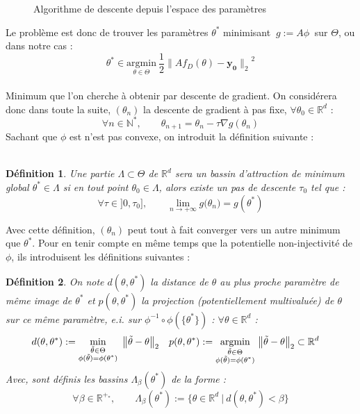 \documentclass[hidelinks, french]{article} %
\newcommand{\N}{\mathbb{N}}
\newcommand{\R}{\mathbb{R}}
\newcommand{\lr}{\longrightarrow}
\newcommand{\argmin}[1]{\underset{#1}{\text{argmin}}}
\renewcommand{\bf}[1]{\boldsymbol{#1}}
\theoremstyle{enonce}
\newtheorem{definition}{Définition}
\theoremstyle{special}
\theoremstyle{rq}
\theoremstyle{exo}
\theoremstyle{demo}
\begin{document}
\begin{wrapfigure}{r}{0.43\textwidth}
	
	\caption{Algorithme de descente depuis l'espace des paramètres}
	\label{fig:pcode LGD}
\end{wrapfigure}

Le problème est donc de trouver les paramètres $\theta^*$ minimisant $\ g:=A\phi\ $ sur $\Theta$, ou dans notre cas :
\[\theta^*\in\argmin{\theta\in\Theta}\ \frac{1}{2}{\big\|Af_D(\theta)-\bf{y_0}\big\|_2}^2\]
\\
Minimum que l'on cherche à obtenir par descente de gradient. On considérera donc dans toute la suite, $(\theta_n)$ la descente de gradient à pas fixe, $\forall\theta_0\in\R^d$ :
\[\forall n\in\N^*,\qquad \theta_{n+1} = \theta_n - \tau\nabla g(\theta_n)\]
Sachant que $\phi$ est n'est pas convexe, on introduit la définition suivante :
\\ \\
\begin{definition}
	Une partie $\Lambda\subset\Theta$ de $\R^d$ sera un \emph{bassin d'attraction} de minimum global $\theta^*\in\Lambda$ si en tout point $\theta_0\in\Lambda$, alors existe un pas de descente $\tau_0$ tel que :
	\[\forall \tau\in]0,\tau_0],\qquad \lim_{n\lr+\infty}g\big(\theta_n\big)=g(\theta^*)\]
\end{definition}

Avec cette définition, $(\theta_n)$ peut tout à fait converger vers un autre minimum que $\theta^*$. Pour en tenir compte en même temps que la potentielle non-injectivité de $\phi$, ils introduisent les définitions suivantes :
\\
\begin{definition}\label{def:boule}
	On note $d(\theta,\theta^*)$ la distance de $\theta$ au plus proche paramètre de même image de $\theta^*$ et $p(\theta,\theta^*)$ la projection (potentiellement multivaluée) de $\theta$ sur ce même paramètre, e.i. sur $\phi^{-1}\circ\phi(\{\theta^*\})$ :
	$\forall\theta\in\R^d$ :
	\begin{align*}d(\theta,\theta^*) &:=\min_{\substack{\Tilde{\theta}\in\Theta\\ \phi(\Tilde{\theta})=\phi(\theta^*)}}\ \big\|\Tilde{\theta}-\theta\big\|_2  &  p(\theta,\theta^*)&:=\argmin{\substack{\Tilde{\theta}\in\Theta\\ \phi(\Tilde{\theta})=\phi(\theta^*)}}\ \big\|\Tilde{\theta}-\theta\big\|_2\subset\R^d\end{align*}
	Avec, sont définis les bassins $\Lambda_\beta(\theta^*)$ de la forme :
	\[\forall \beta\in\R^{+_*},\qquad \Lambda_\beta(\theta^*):=\big\{\theta\in\R^d\ |\ d(\theta, \theta^*)<\beta\big\}\]
\end{definition}
\end{document}
